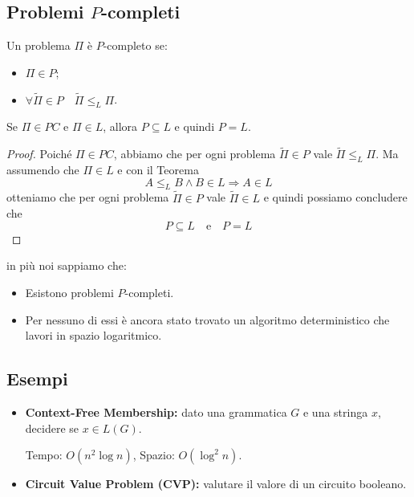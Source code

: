 \vspace{-0.5cm}

\subsection*{Problemi $P$-completi}

Un problema $\Pi$ è $P$-completo se:
\begin{itemize}
    \item $\Pi \in P$;
    \item $\forall \widetilde{\Pi} \in P \quad \widetilde{\Pi} \leq_L \Pi$. \\
\end{itemize}

\begin{theor}
Se $\Pi \in PC$ e $\Pi \in L$, allora $P \subseteq L$ e quindi $P = L$.
\end{theor}

\begin{proof}
Poiché $\Pi \in PC$, abbiamo che per ogni problema $ \widetilde{\Pi}  \in P$ vale $ \widetilde{\Pi}  \leq_L \Pi$. Ma assumendo che $\Pi \in L$ e con il Teorema
\[ A \leq_L B \land B \in L \Rightarrow A \in L \]
otteniamo che per ogni problema $\widetilde{\Pi} \in P$ vale $\widetilde{\Pi} \in L$ e quindi possiamo concludere che
\[ P \subseteq L \quad \text{e} \quad P = L \]
\end{proof}

\vspace{-0.5cm}

in più noi sappiamo che:

\begin{itemize}
    \item Esistono problemi $P$-completi.
    \item Per nessuno di essi è ancora stato trovato un algoritmo deterministico che lavori in spazio logaritmico.
\end{itemize}

\subsection*{Esempi}

\begin{itemize}
    \item \textbf{Context-Free Membership:} dato una grammatica $G$ e una stringa $x$, decidere se $x \in L(G)$.

    Tempo: $O(n^2 \log n)$, Spazio: $O(\log^2 n)$.

    \item \textbf{Circuit Value Problem (CVP):} valutare il valore di un circuito booleano.
\end{itemize}

